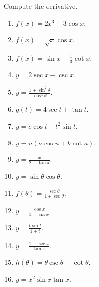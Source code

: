 
Compute the derivative.
\begin{multicols}{2}
\begin{enumerate}
\item $\displaystyle f(x)= 2x^3 -3 \cos x$.

\item $\displaystyle f(x)=\sqrt{x}\cos x$.

\item $\displaystyle f(x)=\sin x +\frac{1}{3}\cot x$.

\item $\displaystyle y=2\sec x - \csc x$.

\item $\displaystyle y=\frac{1+\sin^2\theta}{\cos^3\theta}$.

\item $\displaystyle g(t)=4 \sec t + \tan t$.

\item $\displaystyle y= c\cos t + t^2\sin t$.

\item $\displaystyle y=u(a\cos u + b \cot u)$.

\item $\displaystyle y=\frac{x}{2-\tan x}$.

\item $\displaystyle y=\sin \theta \cos \theta$.

\answer{$\cos (2\theta)= \cos^2\theta- \sin^2\theta$}
\item $\displaystyle f(\theta)=\frac{\sec \theta}{1+\sec \theta}$.

\item $\displaystyle y=\frac{\cos x}{1-\sin x}$.

\item $\displaystyle y=\frac{t\sin t}{1+t}$.

\item $\displaystyle y=\frac{1-\sec x}{\tan x}$.

\item $\displaystyle h(\theta)=\theta \csc \theta -\cot \theta$.

\item $\displaystyle y=x^2\sin x\tan x$.

\end{enumerate}
\end{multicols}
